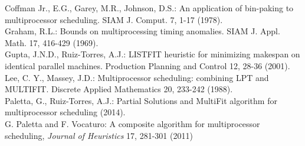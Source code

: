 \documentclass[12pt,a4paper]{article}
\begin{document}
\begin{thebibliography}{}
Coffman Jr., E.G., Garey, M.R., Johnson, D.S.: An application of
bin-paking to multiprocessor scheduling. SIAM J. Comput. 7, 1-17
(1978).\vspace{0.3cm}\\

Graham, R.L.: Bounds on multiprocessing timing anomalies. SIAM J.
Appl. Math. 17, 416-429 (1969).\vspace{0.3cm}\\

Gupta, J.N.D., Ruiz-Torres, A.J.: LISTFIT heuristic for minimizing
makespan on identical parallel machines. Production
Planning and Control 12, 28-36 (2001).\vspace{0.3cm}\\
Lee, C. Y., Massey, J.D.: Multiprocessor scheduling: combining LPT
and MULTIFIT. Discrete Applied Mathematics 20, 233-242
(1988).\vspace{0.3cm}\\
Paletta, G., Ruiz-Torres, A.J.: Partial Solutions and MultiFit
algorithm for multiprocessor scheduling (2014).\vspace{0.3cm}\\
G. Paletta and F. Vocaturo: A composite algorithm for multiprocessor
scheduling, \textit{Journal of Heuristics} 17, 281-301 (2011)
\vspace{0.3cm}
\end{thebibliography}
\end{document}

